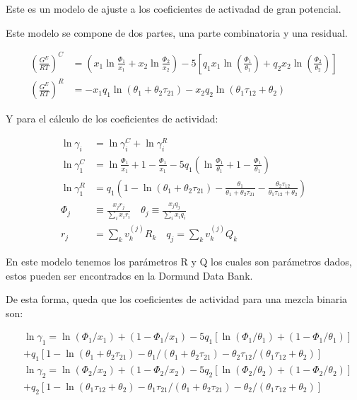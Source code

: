 Este es un modelo de ajuste a los coeficientes de activadad de gran potencial.

Este modelo se compone de dos partes, una parte combinatoria y una residual.

\begin{align}
    \left(\frac{G^{E}}{R T}\right)^{C}&=\left(x_{1} \ln \frac{\Phi_{1}}{x_{1}}+x_{2} \ln \frac{\Phi_{2}}{x_{2}}\right)-5\left[q_{1} x_{1} \ln \left(\frac{\Phi_{1}}{\theta_{1}}\right)+q_{2} x_{2} \ln \left(\frac{\Phi_{2}}{\theta_{2}}\right)\right]\\
    \left(\frac{G^{E}}{R T}\right)^{R}&=-x_{1} q_{1} \ln \left(\theta_{1}+\theta_{2} \tau_{21}\right)-x_{2} q_{2} \ln \left(\theta_{1} \tau_{12}+\theta_{2}\right)
\end{align}

Y para el cálculo de los coeficientes de actividad:


\begin{align}
    \ln \gamma_{i}&=\ln \gamma_{i}^{C}+\ln \gamma_{i}^{R} \\
    \ln \gamma_{1}^{C}&=\ln \frac{\Phi_{1}}{x_{1}}+1-\frac{\Phi_{1}}{x_{1}}-5 q_{1}\left(\ln \frac{\Phi_{1}}{\theta_{1}}+1-\frac{\Phi_{1}}{\theta_{1}}\right) \\
    \ln \gamma_{1}^{R}&=q_{1}\left(1-\ln \left(\theta_{1}+\theta_{2} \tau_{21}\right)-\frac{\theta_{1}}{\theta_{1}+\theta_{2} \tau_{21}}-\frac{\theta_{2} \tau_{12}}{\theta_{1} \tau_{12}+\theta_{2}}\right) \\
    \Phi_{j} &\equiv \frac{x_{j} r_{j}}{\sum_{i} x_{i} r_{i}} \quad \theta_{j} \equiv \frac{x_{j} q_{j}}{\sum_{i} x_{i} q_{i}}\\
    r_{j}&=\sum_{k} v_{k}^{(j)} R_{k}  \quad q_{j}=\sum_{k} v_{k}^{(j)} Q_{k}
\end{align}

En este modelo tenemos los parámetros R y Q los cuales son parámetros dados, estos pueden ser encontrados en la Dormund Data Bank.

De esta forma, queda que los coeficientes de actividad para una mezcla binaria son:

\begin{align}
    &\ln \gamma_{1}=\ln \left(\Phi_{1} / x_{1}\right)+\left(1-\Phi_{1} / x_{1}\right)-5 q_{1}\left[\ln \left(\Phi_{1} / \theta_{1}\right)+\left(1-\Phi_{1} / \theta_{1}\right)\right] \\
&+q_{1}\left[1-\ln \left(\theta_{1}+\theta_{2} \tau_{21}\right)-\theta_{1} /\left(\theta_{1}+\theta_{2} \tau_{21}\right)-\theta_{2} \tau_{12} /\left(\theta_{1} \tau_{12}+\theta_{2}\right)\right] \nonumber\\
&\ln \gamma_{2}=\ln \left(\Phi_{2} / x_{2}\right)+\left(1-\Phi_{2} / x_{2}\right)-5 q_{2}\left[\ln \left(\Phi_{2} / \theta_{2}\right)+\left(1-\Phi_{2} / \theta_{2}\right)\right] \\
&+q_{2}\left[1-\ln \left(\theta_{1} \tau_{12}+\theta_{2}\right)-\theta_{1} \tau_{21} /\left(\theta_{1}+\theta_{2} \tau_{21}\right)-\theta_{2} /\left(\theta_{1} \tau_{12}+\theta_{2}\right)\right] \nonumber
\end{align}


